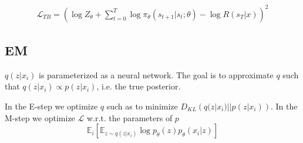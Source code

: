 \begin{align}
     \mathcal{L}_{TB} = \left(\log Z_\theta + \sum_{t=0}^{T} \log \pi_\theta(s_{t+1}|s_{t};\theta) - \log R(s_T \vert x)\right)^2
\end{align}     



















































































\subsection{EM}

$q(z|x_i)$ is parameterized as a neural network. The goal is to approximate $q$ such that $q(z|x_i) \propto p(z|x_i)$, i.e. the true posterior. 

In the E-step we optimize $q$ such as to minimize $D_{KL}\left( q(z|x_i) || p(z|x_i) \right)$.
In the M-step we optimize $\mathcal{L}$ w.r.t. the parameters of $p$
$$ \mathbb{E}_i \left[ \mathbb{E}_{z \sim q(z|x_i)} \log p_\theta(z) p_\theta(x_i|z) \right] $$

